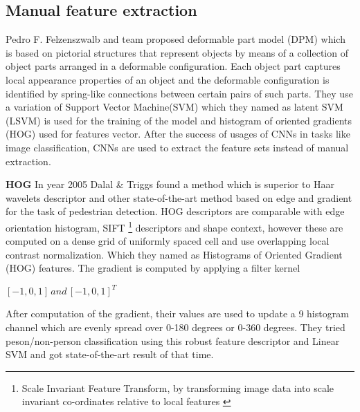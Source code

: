 \subsection{Manual feature extraction}
Pedro F. Felzenszwalb and team proposed deformable part model (DPM) \cite{felzenszwalb2009object} which is based on pictorial structures that represent objects by means of a collection of object parts arranged in a deformable configuration. Each object part captures local appearance properties of
an object and the deformable configuration is identified by spring-like connections between certain pairs of such parts. They use a variation of Support Vector Machine(SVM) which they named as latent SVM (LSVM) is used for the training of the model and  histogram of oriented gradients (HOG) used for features vector. After the success of usages of CNNs in tasks like image classification, CNNs are used to extract the feature sets instead of manual extraction.

\newpara \textbf{HOG }
In year 2005 Dalal \& Triggs found a method which is superior to Haar wavelets descriptor and other state-of-the-art method based on edge and gradient for the task of pedestrian detection. HOG descriptors are comparable with edge orientation histogram, SIFT \footnote{Scale Invariant Feature Transform, by transforming image data into scale invariant co-ordinates relative to local features \cite{lowe2004distinctive}} descriptors and shape context, however these are computed on a dense grid of uniformly spaced cell and use overlapping local contrast normalization. Which they named as Histograms of Oriented Gradient (HOG) features\cite{dalal2005histograms}. The gradient is computed by applying a filter kernel \\
\begin{center}
$[-1,0,1] \, and \, [-1,0,1] ^{T}$
\end{center}

\newpara After computation of the gradient, their values are used to update a 9 histogram channel which are evenly spread over 0-180 degrees or 0-360 degrees. They tried peson/non-person classification using this robust feature descriptor and Linear SVM and got state-of-the-art result of that time.

